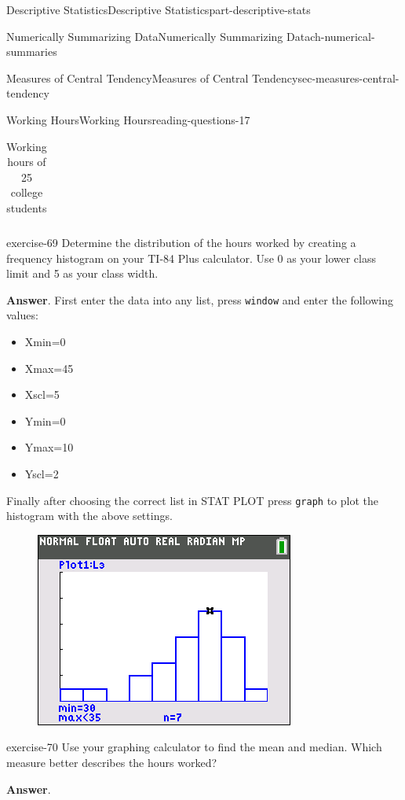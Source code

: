 \documentclass[oneside,10pt,]{book}
\newcommand{\mono}[1]{\texttt{#1}}
\numberwithin{equation}{section}
\begin{document}
\begin{partptx}{Descriptive Statistics}{}{Descriptive Statistics}{}{}{part-descriptive-stats}
\begin{chapterptx}{Numerically Summarizing Data}{}{Numerically Summarizing Data}{}{}{ch-numerical-summaries}
\begin{sectionptx}{Measures of Central Tendency}{}{Measures of Central Tendency}{}{}{sec-measures-central-tendency}
\begin{reading-questions-subsection-numberless}{Working Hours}{}{Working Hours}{}{}{reading-questions-17}
\begin{table}
\begin{tabular}{lllll}
\end{tabular}
\caption{Working hours of 25 college students\label{table-7}}
\end{table}
\begin{divisionexercise}{1}{}{}{exercise-69}%
\hypertarget{p-95}{}%
Determine the distribution of the hours worked by creating a frequency histogram on your TI-84 Plus calculator. Use 0 as your lower class limit and 5 as your class width.%
\par\smallskip%
\noindent\textbf{Answer}.\hypertarget{answer-65}{}\quad%
\hypertarget{p-96}{}%
First enter the data into any list, press \mono{window} and enter the following values:\leavevmode%
\begin{itemize}[label=\textbullet]
\item{}Xmin=0%
\item{}Xmax=45%
\item{}Xscl=5%
\item{}Ymin=0%
\item{}Ymax=10%
\item{}Yscl=2%
\end{itemize}
Finally after choosing the correct list in STAT PLOT press \mono{graph} to plot the histogram with the above settings.%
\begin{figure}\centering\includegraphics[width=0.5\linewidth]{images/hours-worked-freq-histogram.png}
\end{figure}\end{divisionexercise}%
\begin{divisionexercise}{2}{}{}{exercise-70}%
\hypertarget{p-97}{}%
Use your graphing calculator to find the mean and median. Which measure better describes the hours worked?%
\par\smallskip%
\noindent\textbf{Answer}.\hypertarget{answer-66}{}\quad%
\leavevmode%
\begin{sidebyside}{2}{0}{0}{0}%
\begin{sbspanel}{0.5}%

\end{sbspanel}
\end{sidebyside}
\end{divisionexercise}
\end{reading-questions-subsection-numberless}
\end{sectionptx}
\end{chapterptx}
\end{partptx}
\end{document}
